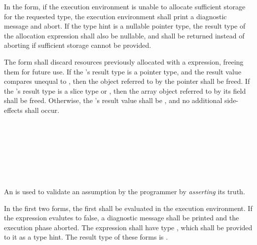 

\specsubsubitem
In the  form, if the execution environment is unable to
allocate sufficient storage for the requested type, the execution environment
shall print a diagnostic message and abort. If the type hint is a nullable
pointer type, the result type of the allocation expression shall also be
nullable, and  shall be returned instead of aborting if
sufficient storage cannot be provided.

\specsubsubitem
The  form shall discard resources previously allocated with a
 expression, freeing them for future use. If the
's result type is a pointer type, and the result value
compares unequal to , then the object referred to by the pointer
shall be freed. If the 's result type is a slice type or
, then the array object referred to by its  field shall
be freed. Otherwise, the 's result value shall be
, and no additional side-effects shall occur.


\begin{grammar}
 \\
	 \terminal{(}  \terminal{)} \\
	 \terminal{(}  \terminal{,}  \terminal{)} \\
	 \terminal{(}  \terminal{)} \\

 \\
	  \\
\end{grammar}

\specsubsubitem
An  is used to validate an assumption by the
programmer by \textit{asserting} its truth.

\specsubsubitem
In the first two forms, the first  shall be evaluated in
the execution environment. If the expression evalutes to false, a diagnostic
message shall be printed and the execution phase aborted. The expression shall
have type , which shall be provided to it as a type hint. The
result type of these forms is .

